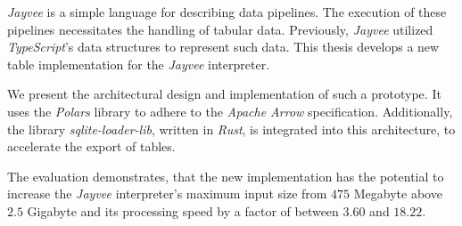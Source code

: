 \emph{Jayvee} is a simple language for describing data pipelines.
The execution of these pipelines necessitates the handling of tabular data.
Previously, \emph{Jayvee} utilized \emph{TypeScript}'s data structures to represent such data.
This thesis develops a new table implementation for the \emph{Jayvee} interpreter.

We present the architectural design and implementation of such a prototype.
It uses the \emph{Polars} library to adhere to the \emph{Apache Arrow} specification.
Additionally, the library \emph{sqlite-loader-lib}, written in \emph{Rust}, is integrated into this architecture, to accelerate the export of tables.

The evaluation demonstrates, that the new implementation has the potential to increase the \emph{Jayvee} interpreter's maximum input size from $475$ Megabyte above $2.5$ Gigabyte and its processing speed by a factor of between $3.60$ and $18.22$.

